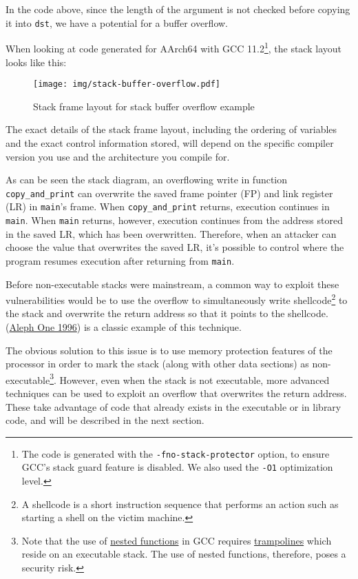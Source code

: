 \documentclass[
  a4paper,
]{report}
\begin{document}
In the code above, since the length of the argument is not checked
before copying it into \texttt{dst}, we have a potential for a buffer
overflow.

When looking at code generated for AArch64 with GCC 11.2\footnote{The
  code is generated with the \texttt{-fno-stack-protector} option, to
  ensure GCC's stack guard feature is disabled. We also used the
  \texttt{-O1} optimization level.}, the stack layout looks like this:

\begin{figure}
\centering
\texttt{[image: img/stack-buffer-overflow.pdf]}
\caption{Stack frame layout for stack buffer overflow example}
\end{figure}

The exact details of the stack frame layout, including the ordering of
variables and the exact control information stored, will depend on the
specific compiler version you use and the architecture you compile for.

As can be seen the stack diagram, an overflowing write in function
\texttt{copy\_and\_print} can overwrite the saved frame pointer (FP) and
link register (LR) in \texttt{main}'s frame. When
\texttt{copy\_and\_print} returns, execution continues in \texttt{main}.
When \texttt{main} returns, however, execution continues from the
address stored in the saved LR, which has been overwritten. Therefore,
when an attacker can choose the value that overwrites the saved LR, it's
possible to control where the program resumes execution after returning
from \texttt{main}.

Before non-executable stacks were mainstream, a common way to exploit
these vulnerabilities would be to use the overflow to simultaneously
write shellcode\footnote{A shellcode is a short instruction sequence
  that performs an action such as starting a shell on the victim
  machine.} to the stack and overwrite the return
address so that it points to the shellcode.
(\protect\hyperlink{ref-AlephOne1996}{Aleph One 1996}) is a classic
example of this technique.

The obvious solution to this issue is to use memory protection features
of the processor in order to mark the stack (along with other data
sections) as non-executable\footnote{Note that the use of
  \href{https://gcc.gnu.org/onlinedocs/gcc/Nested-Functions.html}{nested
  functions} in GCC requires
  \href{https://gcc.gnu.org/onlinedocs/gccint/Trampolines.html}{trampolines}
  which reside on an executable stack. The use of nested functions,
  therefore, poses a security risk.}. However, even when the stack is
not executable, more advanced techniques can be used to exploit an
overflow that overwrites the return address. These take advantage of
code that already exists in the executable or in library code, and will
be described in the next section.
\end{document}
